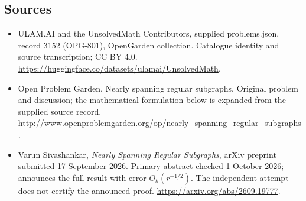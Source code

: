 \documentclass[11pt,a4paper]{article}
\begin{document}
\subsection{Sources}
\begin{itemize}
\item[S1] ULAM.AI and the UnsolvedMath Contributors, supplied problems.json, record 3152 (OPG-801), OpenGarden collection. Catalogue identity and source transcription; CC BY 4.0.
\url{https://huggingface.co/datasets/ulamai/UnsolvedMath}.
\item[S2] Open Problem Garden, Nearly spanning regular subgraphs. Original problem and discussion; the mathematical formulation below is expanded from the supplied source record.
\url{http://www.openproblemgarden.org/op/nearly_spanning_regular_subgraphs}.

\item[R1] Varun Sivashankar, \emph{Nearly Spanning Regular Subgraphs},
arXiv preprint submitted 17 September 2026. Primary abstract checked
1 October 2026; announces the full result with error $O_k(r^{-1/2})$.
The independent attempt does not certify the announced proof.
\url{https://arxiv.org/abs/2609.19777}.

\end{itemize}
\end{document}
